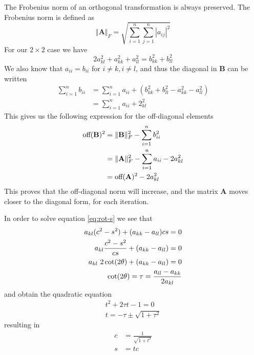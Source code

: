 \documentclass[a4paper]{revtex4}
\begin{document}
The Frobenius norm of an orthogonal transformation is always preserved. The
Frobenius norm is defined as
\begin{equation}
  \Vert\mathbf{A}\Vert_F = \sqrt{\sum_{i=1}^n \sum_{j=1}^n|a_{ij}|^2}
\end{equation}
For our $2 \times 2$ case we have
\begin{equation}
  2a_{kl}^2 + a_{kk}^2 + a_{ll}^2 = b_{kk}^2 + b_{ll}^2
\end{equation}
We also know that $a_{ii} = b_{ii}$ for $i \neq k, i \neq l$, and thus the
diagonal in $\mathbf{B}$ can be written
\begin{align}
  \sum_{i=1}^n b_{ii}
  &=
  \sum_{i=1}^n a_{ii} + (b_{kk}^2 + b_{ll}^2 - a_{kk}^2 - a_{ll}^2) \\
  &=
  \sum_{i=1}^n a_{ii} + 2_{kl}^2
\end{align}
This gives us the following expression for the off-diagonal elements
\begin{align}
  \text{off}(\mathbf{B})^2
  &= \Vert\mathbf{B}\Vert_F^2 - \sum_{i=1}^n b_{ii}^2 \notag\\
  &= \Vert\mathbf{A}\Vert_F^2 - \sum_{i=1}^n a_{ii} -2a_{kl}^2 \notag\\
  &= \text{off}(\mathbf{A})^2 - 2a_{kl}^2
\end{align}
This proves that the off-diagonal norm will increase, and the matrix
$\mathbf{A}$ moves closer to the diagonal form, for each iteration.

In order to solve equation \vref{eq:rot-s} we see that
\begin{align}
  a_{kl}(c^2 - s^2) + (a_{kk} - a_{ll})cs = 0 \notag\\
  a_{kl}\frac{c^2 - s^2}{cs} + (a_{kk} - a_{ll}) = 0 \notag\\
  a_{kl}~2\cot(2\theta) + (a_{kk} - a_{ll}) = 0 \notag\\
  \cot(2\theta) = \tau = \frac{a_{ll} - a_{kk}}{2a_{kl}}
\end{align}
and obtain the quadratic equation
\begin{align}
  t^2 + 2\tau t - 1 = 0 \\
  t = -\tau \pm \sqrt{1+\tau^2}
\end{align}
resulting in
\begin{align}
  c &= \frac{1}{\sqrt{1 + t^2}} \\
  s &= tc
\end{align}
\end{document}
